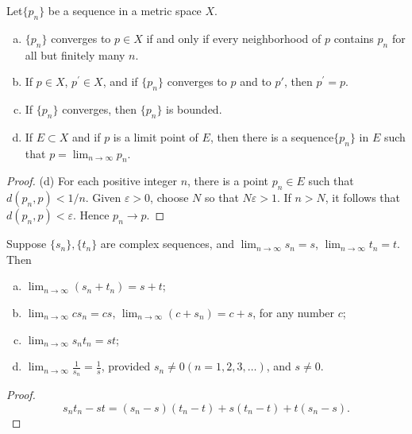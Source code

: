 
\begin{thm}\label{thm:3.2}
    Let$\{p_n\}$ be a sequence in a metric space $X$.
    \begin{enumerate}[(a)]
        \item $\{p_n\}$ converges to $p \in X$ if and only if every neighborhood of $p$ contains $p_n$ for all but finitely many $n$.
        \item If $p\in X$, $p^\prime \in X$, and if $\{p_n\}$ converges to $p$ and to $p'$, then $p^\prime =p$.
        \item If $\{p_n\}$ converges, then $\{p_n\}$ is bounded.
        \item If $E \subset X$ and if $p$ is a limit point of $E$, then there is a sequence$\{p_n\}$ in $E$ such that $p = \lim_{n \to \infty} p_n$.
    \end{enumerate}
\end{thm}

\begin{proof}
    (d) For each positive integer $n$, there is a point $p_n \in E$ such that $d(p_n,p) <1/n$. Given $\varepsilon > 0$, choose $N$ so that $N \varepsilon >1$. If $n>N$, it follows that $d(p_n, p) <\varepsilon$. Hence $p_n \rightarrow p$.
\end{proof}

\begin{thm}\label{thm:3.3}
    Suppose $\{s_n\}, \{t_n\}$ are complex sequences, and 
    $\lim_{n \to \infty} s_n = s$,
    $\lim_{n \to \infty} t_n = t$.
    Then
    \begin{enumerate}[(a)]
        \item $\lim_{n \to \infty} (s_n + t_n) = s + t$;
        \item $\lim_{n \to \infty} c s_n = cs$, $\lim_{n \to \infty} (c + s_n) = c + s$, for any number $c$;
        \item $\lim_{n \to \infty} s_n t_n = st$;
        \item $\lim_{n \to \infty} \frac{1}{s_n} = \frac{1}{s}$, provided $s_n \neq 0(n = 1,2,3,\dots)$, and $s \neq 0$.
    \end{enumerate}
\end{thm}

\begin{proof}
    \begin{equation}
        \label{eq:3.1}
        s_n t_n - st = (s_n - s)(t_n - t) + s(t_n - t) + t(s_n - s).
    \end{equation}
\end{proof}

